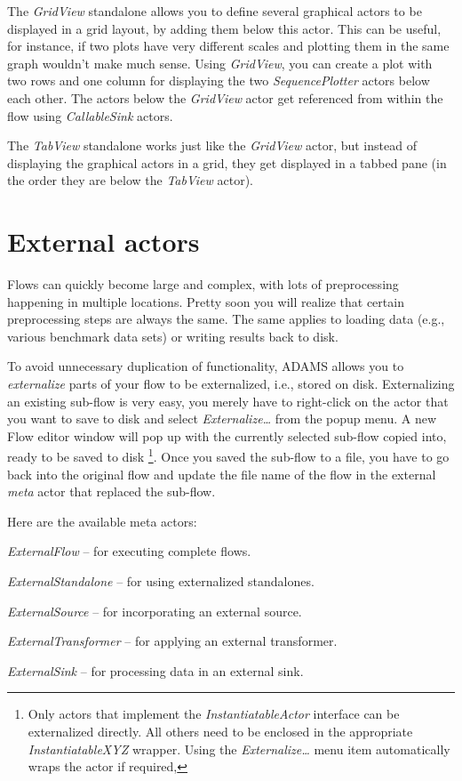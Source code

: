 The \textit{GridView} standalone allows you to define several graphical actors
to be displayed in a grid layout, by adding them below this actor. This can be 
useful, for instance, if two plots have very different scales and plotting them 
in the same graph wouldn't make much sense. Using \textit{GridView}, you can create 
a plot with two rows and one column for displaying the two \textit{SequencePlotter}
actors below each other. The actors below the \textit{GridView} actor get
referenced from within the flow using \textit{CallableSink} actors.

The \textit{TabView} standalone works just like the \textit{GridView} actor,
but instead of displaying the graphical actors in a grid, they get displayed
in a tabbed pane (in the order they are below the \textit{TabView} actor).

\newpage
\section{External actors}
\label{external_actors}
Flows can quickly become large and complex, with lots of preprocessing
happening in multiple locations. Pretty soon you will realize that certain
preprocessing steps are always the same. The same applies to loading data
(e.g., various benchmark data sets) or writing results back to disk.

To avoid unnecessary duplication of functionality, ADAMS allows you to
\textit{externalize} parts of your flow to be externalized, i.e., stored on
disk. Externalizing an existing sub-flow is very easy, you merely have to
right-click on the actor that you want to save to disk and select
\textit{Externalize\ldots} from the popup menu. A new Flow editor window will
pop up with the currently selected sub-flow copied into, ready to be saved to
disk \footnote{Only actors that implement the \textit{InstantiatableActor}
interface can be externalized directly. All others need to be enclosed in the
appropriate \textit{InstantiatableXYZ} wrapper. Using the
\textit{Externalize\ldots} menu item automatically wraps the actor if
required,}. Once you saved the sub-flow to a file, you have to go back into the
original flow and update the file name of the flow in the external \textit{meta}
actor that replaced the sub-flow.

Here are the available meta actors:
\begin{tight_itemize}
	\item \textit{ExternalFlow} -- for executing complete flows.
	\item \textit{ExternalStandalone} -- for using externalized standalones.
	\item \textit{ExternalSource} -- for incorporating an external source.
	\item \textit{ExternalTransformer} -- for applying an external transformer.
	\item \textit{ExternalSink} -- for processing data in an external sink.
\end{tight_itemize}


